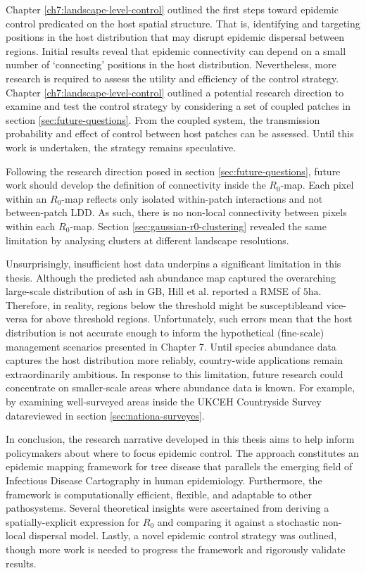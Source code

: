 Chapter \ref{ch7:landscape-level-control} outlined the first steps toward epidemic control predicated on the host spatial structure.
That is, identifying and targeting positions in the host distribution that may disrupt epidemic dispersal between regions.
Initial results reveal that epidemic connectivity can depend on a small number of `connecting' positions in the host distribution.
Nevertheless, more research is required to assess the utility and efficiency of the control strategy. Chapter \ref{ch7:landscape-level-control}
outlined a potential research direction to examine and test the control strategy by considering a set of coupled patches in section \ref{sec:future-questions}.
From the coupled system,  the transmission probability and effect of control between host patches can be assessed.
Until this work is undertaken, the strategy remains speculative.

Following the research direction posed in section \ref{sec:future-questions}, future work should develop the definition of connectivity inside the $R_0$-map. Each pixel within an $R_0$-map reflects only isolated within-patch interactions and not between-patch LDD.
As such, there is no non-local connectivity between pixels within each $R_0$-map. Section \ref{sec:gaussian-r0-clustering} revealed the same limitation by analysing clusters at different landscape resolutions.

Unsurprisingly, insufficient host data underpins a significant limitation in this thesis.
Although the predicted ash abundance map captured the overarching large-scale distribution of ash in GB, Hill et al. reported a RMSE of $5\mathrm{ha}$. Therefore, in reality, regions below the threshold might be susceptible\textemdash and vice-versa for above threshold regions.
Unfortunately, such errors mean that the host distribution is not accurate enough to inform the hypothetical (fine-scale) management scenarios presented in Chapter 7. Until species abundance data captures the host distribution more reliably, country-wide applications remain extraordinarily ambitious. In response to this limitation, future research could concentrate on smaller-scale areas where abundance data is known. For example, by examining well-surveyed areas inside the UKCEH Countryside Survey data\textemdash reviewed in section \ref{sec:nationa-surveyes}.

In conclusion, the research narrative developed in this thesis aims to help inform policymakers about where to focus epidemic control.
The approach constitutes an epidemic mapping framework for tree disease that parallels the emerging field of Infectious Disease Cartography in human epidemiology. Furthermore, the framework is computationally efficient, flexible, and adaptable to other pathosystems.
Several theoretical insights were ascertained from deriving a spatially-explicit expression for $R_0$ and comparing it against a stochastic non-local dispersal model. Lastly, a novel epidemic control strategy was outlined, though more work is needed to progress the framework and rigorously validate results.

